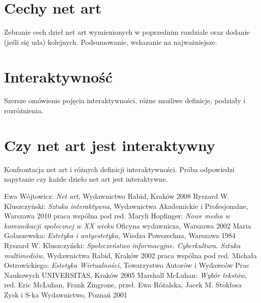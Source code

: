 \documentclass[a4paper,12pt]{article}
\begin{document}
\section{Cechy net art}
Zebranie cech dzieł net art wymienionych
w poprzednim rozdziale oraz dodanie (jeśli się uda) kolejnych.
Podsumowanie, wskazanie na najważniejsze.

\section{Interaktywność}
Szersze omówienie pojęcia interaktywności, różne możliwe
definicje, podziały i rozróżnienia.

\section{Czy net art jest interaktywny}
Konfrontacja net art i różnych definicji interaktywności.
Próba odpowiedzi napytanie czy każde dzieło net art jest
interaktywne.


\begin{thebibliography}{6}
  Ewa Wójtowicz:
  \textit{Net art},
  Wydawnictwo Rabid, Kraków 2008
  Ryszard W. Kluszczyński:
  \textit{Sztuka interaktywna},
  Wydawnictwa Akademickie i Profesjonalne,
  Warszawa 2010
  praca wspólna pod red. Maryli Hopfinger:
  \textit{Nowe media w komunikacji społecznej w XX wieku}
  Oficyna wydawnicza,
  Warszawa 2002
  Maria Gołaszewska:
  \textit{Estetyka i antyestetyka},
  Wiedza Powszechna, Warszawa 1984
  Ryszard W. Kluszczyński:
  \textit{Społeczeństwo informacyjne. Cyberkultura. Sztuka multimediów},
  Wydawnictwa Rabid, Kraków 2002
  praca wspólna pod red. Michała Ostrowickiego:
  \textit{Estetyka Wirtualności},
  Towarzystwo Autorów i Wydawców Prac Naukowych UNIVERSITAS,
  Kraków 2005
  Marshall McLuhan:
  \textit{Wybór tekstów},
  red. Eric McLuhan, Frank Zingrone,
  przeł. Ewa Różalska, Jacek M. Stokłosa
  Zysk i S-ka Wydawnictwo, Poznań 2001


\end{thebibliography}
\end{document}
